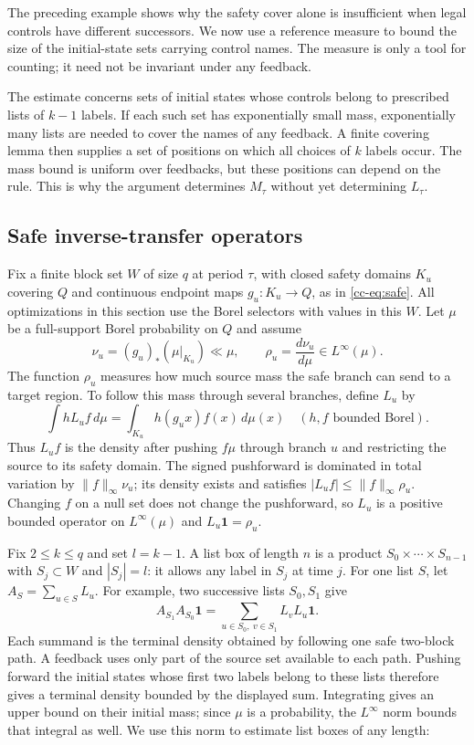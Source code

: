 \documentclass[11pt,reqno]{amsart}
\numberwithin{equation}{section}
\theoremstyle{definition}
\theoremstyle{definition}
\newcommand{\one}{\mathbf 1}
\begin{document}
The preceding example shows why the safety cover alone is insufficient
when legal controls have different successors. We now use a reference
measure to bound the size of the initial-state sets carrying control
names. The measure is only a tool for counting; it need not be
invariant under any feedback.

The estimate concerns sets of initial states whose controls belong to
prescribed lists of $k-1$ labels. If each such set has exponentially
small mass, exponentially many lists are needed to cover the names of
any feedback. A finite covering lemma then supplies a set of positions
on which all choices of $k$ labels occur. The mass bound is uniform
over feedbacks, but these positions can depend on the rule. This is
why the argument determines $M_\tau$ without yet determining $L_\tau$.

\subsection{Safe inverse-transfer operators}
Fix a finite block set $W$ of size $q$ at period $\tau$, with
closed safety domains $K_u$ covering $Q$ and continuous endpoint
maps $g_u:K_u\to Q$, as in \eqref{cc-eq:safe}. All optimizations
in this section use the Borel selectors with values in this $W$.
Let $\mu$ be a full-support Borel probability on $Q$ and assume
\begin{equation}\label{eq:cap-density}
 \nu_u=(g_u)_*(\mu|_{K_u})\ll\mu,\qquad
 \rho_u=\frac{d\nu_u}{d\mu}\in L^\infty(\mu).
\end{equation}
The function $\rho_u$ measures how much source mass the safe branch
can send to a target region. To follow this mass through several
branches, define $L_u$ by
\begin{equation}\label{eq:cap-transfer}
 \int hL_uf\,d\mu=\int_{K_u}h(g_ux)f(x)\,d\mu(x)
 \quad(h,f\text{ bounded Borel}).
\end{equation}
Thus $L_uf$ is the density after pushing $f\mu$ through branch $u$
and restricting the source to its safety domain. The signed
pushforward is dominated in total variation by $\|f\|_\infty\nu_u$;
its density exists and satisfies
$|L_uf|\le\|f\|_\infty\rho_u$. Changing $f$ on a null set
does not change the pushforward, so $L_u$ is a positive bounded
operator on $L^\infty(\mu)$ and $L_u\one=\rho_u$.

Fix $2\le k\le q$ and set $l=k-1$. A list box of length $n$
is a product $S_0\times\cdots\times S_{n-1}$ with $S_j\subset W$
and $|S_j|=l$: it allows any label in $S_j$ at time $j$.
For one list $S$, let $A_S=\sum_{u\in S}L_u$. For example, two
successive lists $S_0,S_1$ give
\[
 A_{S_1}A_{S_0}\one
   =\sum_{u\in S_0,\ v\in S_1}L_vL_u\one.
\]
Each summand is the terminal density obtained by following one
safe two-block path. A feedback uses only part of the source set
available to each path. Pushing forward the initial states whose
first two labels belong to these lists therefore gives a terminal
density bounded by the displayed sum. Integrating gives an upper
bound on their initial
mass; since $\mu$ is a probability, the $L^\infty$ norm bounds that
integral as well. We use this norm to estimate list boxes of any length:
\end{document}
